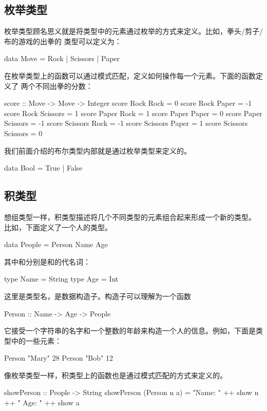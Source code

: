 \subsection{枚举类型}

枚举类型顾名思义就是将类型中的元素通过枚举的方式来定义。比如，拳头/剪子/布的游戏的出拳的
类型可以定义为：
\begin{code}
data Move = Rock | Scissors | Paper
\end{code}
在枚举类型上的函数可以通过模式匹配，定义如何操作每一个元素。下面的函数定义了
两个不同出拳的分数：
\begin{code}
score :: Move -> Move -> Integer
score Rock Rock         = 0
score Rock Paper        = -1
score Rock Scissors     = 1
score Paper Rock        = 1
score Paper Paper       = 0
score Paper Scissors    = -1
score Scissors Rock     = -1
score Scissors Paper    = 1
score Scissors Scissors = 0
\end{code}

\begin{remark}
我们前面介绍的布尔类型内部就是通过枚举类型来定义的。
\begin{code}
data Bool = True | False
\end{code}
\end{remark}

\subsection{积类型}

想组类型一样，积类型描述将几个不同类型的元素组合起来形成一个新的类型。
比如，下面定义了一个人的类型。
\begin{code}
data People = Person Name Age
\end{code}
其中和分别是和的代名词：
\begin{code}
type Name = String
type Age = Int
\end{code}
这里是类型名，是数据构造子。构造子可以理解为一个函数
\begin{code}
Person :: Name -> Age -> People
\end{code}
它接受一个字符串的名字和一个整数的年龄来构造一个人的信息。例如，下面是类型中的一些元素：
\begin{code}
Person "Mary" 28
Person "Bob"  12
\end{code}

像枚举类型一样，积类型上的函数也是通过模式匹配的方式来定义的。
\begin{code}
showPerson :: People -> String
showPerson (Person n a) = "Name: " ++ show n ++ " Age: " ++ show a
\end{code}

